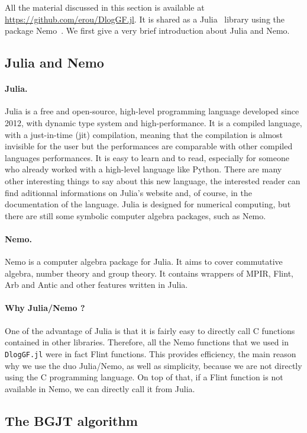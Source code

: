\documentclass[a4paper,11pt]{article}
\theoremstyle{break}
\theoremstyle{sc}
\theoremstyle{definition}
\theoremstyle{remark}
\begin{document}
All the material discussed in this section is available at
\url{https://github.com/erou/DlogGF.jl}. It is shared as a
Julia~\cite{Julia} library using the package Nemo~\cite{Nemo}. We first give
a very brief introduction about Julia and Nemo.
\subsection{Julia and Nemo}
\paragraph{Julia.} Julia is a free and open-source, high-level
programming language developed
since 2012, with dynamic type system and high-performance. It is a compiled
language, with a just-in-time (jit) compilation, meaning that the compilation
is almost invisible for the user but the performances are comparable with
other compiled languages performances. It is easy to learn and to read,
especially for someone who already worked with a high-level language like
Python. There are many other interesting things to say about this new
language, the interested reader can find aditionnal informations on Julia's
website and, of course, in the documentation of the language. Julia is designed for numerical computing, but there are still some
symbolic computer algebra packages, such as Nemo.

\paragraph{Nemo.} Nemo is a computer algebra package for Julia. It aims to cover
commutative algebra, number theory and group theory. It contains wrappers of
MPIR, Flint, Arb and Antic and other features written in Julia. 

\paragraph{Why Julia/Nemo ?}

One of the advantage of Julia is that it is fairly easy to directly call C
functions contained in other libraries. Therefore, all the Nemo functions
that we used in \texttt{DlogGF.jl} were in fact Flint functions. This
provides efficiency, the main reason why we use the duo Julia/Nemo, as well as
simplicity, because we are not directly using the C programming
language. On top of that, if a Flint function is not available in Nemo, we
can directly call it from Julia.

\subsection{The BGJT algorithm}
\end{document}
